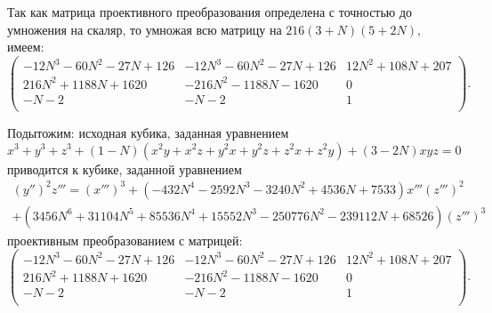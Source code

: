 \documentclass[a4paper,12pt]{article}
\theoremstyle{definition}
\begin{document}
    Так как матрица проективного преобразования определена с точностью до
    умножения на скаляр, то умножая всю матрицу на \(216 (3 + N) (5 + 2 N)\),
    имеем:
    \[
    \begin{pmatrix}
        -12 N^3 - 60 N^2 - 27 N + 126 &  -12 N^3 - 60 N^2 - 27 N + 126 &
        12 N^2 + 108 N + 207 \\
        216 N^2 + 1188 N + 1620 &  -216 N^2 - 1188 N - 1620 & 0 \\
        -N - 2 &  -N - 2 & 1 \\
    \end{pmatrix}
    .\] 
    
    \bigskip
    \bigskip

    \noindent Подытожим: исходная кубика, заданная уравнением
    \[
    x^3 + y^3 + z^3 + (1 - N) (x^2 y + x^2 z + y^2 x + y^2 z + z^2 x + z^2 y) +
    (3 - 2 N) x y z = 0
    \] 
    приводится к кубике, заданной уравнением
    \begin{multline*}
        \left( y'' \right)^2 z''' = \left( x''' \right)^3  +  \left(-432 N^4
        - 2592 N^3 - 3240 N^2 + 4536 N + 7533\right) x''' \left( z'''
        \right)^2 \\ 
        +  \left(3456 N^6 + 31104 N^5 + 85536 N^4 + 15552 N^3 -
        250776 N^2 - 239112 N + 68526 \right) \left( z''' \right)^3
    \end{multline*}
    проективным преобразованием с матрицей:
    \[
    \begin{pmatrix}
        -12 N^3 - 60 N^2 - 27 N + 126 &  -12 N^3 - 60 N^2 - 27 N + 126 &
        12 N^2 + 108 N + 207 \\
        216 N^2 + 1188 N + 1620 &  -216 N^2 - 1188 N - 1620 & 0 \\
        -N - 2 &  -N - 2 & 1 \\
    \end{pmatrix}
    .\] 
\end{document}
